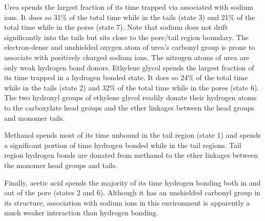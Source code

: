 \documentclass[aps,pre,preprint,groupedaddress]{revtex4-2}
\begin{document}
  Urea spends the largest fraction of its time trapped via 
  associated
  with sodium ions.
  It does so 31\% of the total time while in the tails (state 3) and 21\% of the
  total time while in the pores (state 7). Note that sodium does not drift significantly 
  into the tails but sits close to the pore/tail region boundary. The electron-dense 
  and unshielded oxygen atom of urea's carbonyl group is prone to associate with 
  positively charged sodium ions. The nitrogen atoms of urea are only weak hydrogen bond
  donors.
  Ethylene glycol spends the largest fraction of its time trapped in a hydrogen
  bonded state. It does so 24\% of the total time while in the tails (state 2)
  and 32\% of the total time while in the pores (state 6). The two hydroxyl groups 
  of ethylene glycol readily donate their hydrogen atoms to the carboxylate
  head groups and the ether linkages between the head groups and monomer tails. 
  
  Methanol spends most of its time unbound in the tail region (state 1) and spends a 
  significant portion of time hydrogen bonded while in the tail regions.
  Tail region hydrogen bonds are donated from methanol to the ether linkages between
  the monomer head groups and tails.
  
  Finally, acetic acid spends the majority of its time hydrogen bonding both in and out
  of the pore (states 2 and 6). Although it has an unshielded carbonyl group in its
  structure, association with sodium ions in this environment is apparently a much 
  weaker interaction than hydrogen bonding.
  
\end{document}
